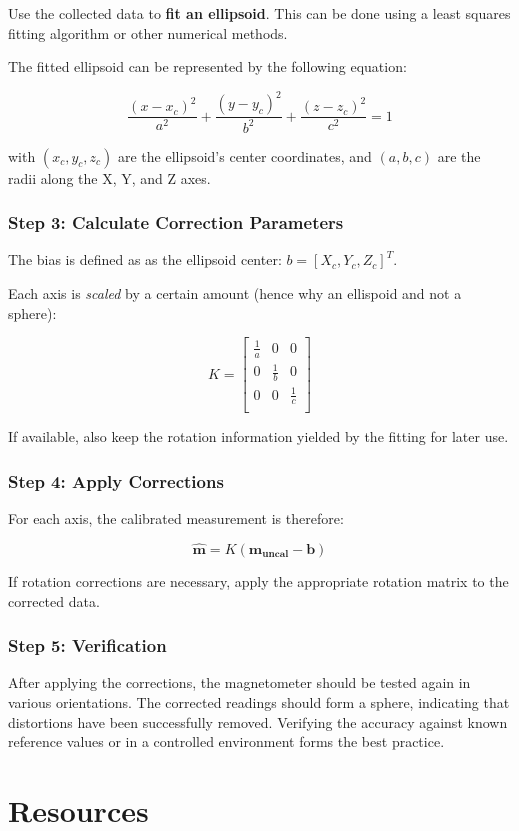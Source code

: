 \documentclass[12pt]{article}
\begin{document}
Use the collected data to \textbf{fit an ellipsoid}. This can be done
using a least squares fitting algorithm or other numerical methods.

The fitted ellipsoid can be represented by the following equation:

\[\frac{(x−x_c)^2}{a^2}+\frac{(y−y_c)^2}{b^2}+\frac{(z−z_c)^2}{c^2}=1\]

with \((x_c,y_c,z_c)\) are the ellipsoid's center coordinates, and
\((a,b,c)\) are the radii along the X, Y, and Z axes.

\subsubsection{Step 3: Calculate Correction
Parameters}\label{step-3-calculate-correction-parameters}

The bias is defined as as the ellipsoid center: \(b = [X_c,Y_c,Z_c]^T\).

Each axis is \emph{scaled} by a certain amount (hence why an ellispoid
and not a sphere):

\[K = \begin{bmatrix}
\frac{1}{a} & 0 & 0 \\
0 & \frac{1}{b} & 0 \\
0 & 0 & \frac{1}{c} \\
\end{bmatrix}\]

If available, also keep the rotation information yielded by the fitting
for later use.

\subsubsection{Step 4: Apply
Corrections}\label{step-4-apply-corrections}

For each axis, the calibrated measurement is therefore:

\[\boldsymbol{\hat m} = K(\boldsymbol{m_{uncal}} - \boldsymbol{b})\]

If rotation corrections are necessary, apply the appropriate rotation
matrix to the corrected data.

\subsubsection{Step 5: Verification}\label{step-5-verification}

After applying the corrections, the magnetometer should be tested again
in various orientations. The corrected readings should form a sphere,
indicating that distortions have been successfully removed. Verifying
the accuracy against known reference values or in a controlled
environment forms the best practice.

\section{Resources}\label{resources}
\end{document}
